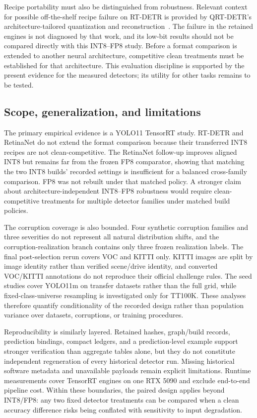 \documentclass[a4paper,fleqn]{cas-dc}
\begin{document}
Recipe portability must also be distinguished from robustness. Relevant context for possible off-the-shelf recipe failure on RT-DETR is provided by QRT-DETR's architecture-tailored quantization and reconstruction~\citep{huo2026qrt}. The failure in the retained engines is not diagnosed by that work, and its low-bit results should not be compared directly with this INT8--FP8 study. Before a format comparison is extended to another neural architecture, competitive clean treatments must be established for that architecture. This evaluation discipline is supported by the present evidence for the measured detectors; its utility for other tasks remains to be tested.

\subsection{Scope, generalization, and limitations}

The primary empirical evidence is a YOLO11 TensorRT study. RT-DETR and RetinaNet do not extend the format comparison because their transferred INT8 recipes are not clean-competitive. The RetinaNet follow-up improves aligned INT8 but remains far from the frozen FP8 comparator, showing that matching the two INT8 builds' recorded settings is insufficient for a balanced cross-family comparison. FP8 was not rebuilt under that matched policy. A stronger claim about architecture-independent INT8--FP8 robustness would require clean-competitive treatments for multiple detector families under matched build policies.

The corruption coverage is also bounded. Four synthetic corruption families and three severities do not represent all natural distribution shifts, and the corruption-realization branch contains only three frozen realization labels. The final post-selection rerun covers VOC and KITTI only. KITTI images are split by image identity rather than verified scene/drive identity, and converted VOC/KITTI annotations do not reproduce their official challenge rules. The seed studies cover YOLO11m on transfer datasets rather than the full grid, while fixed-class-universe resampling is investigated only for TT100K. These analyses therefore quantify conditionality of the recorded design rather than population variance over datasets, corruptions, or training procedures.

Reproducibility is similarly layered. Retained hashes, graph/build records, prediction bindings, compact ledgers, and a prediction-level example support stronger verification than aggregate tables alone, but they do not constitute independent regeneration of every historical detector run. Missing historical software metadata and unavailable payloads remain explicit limitations. Runtime measurements cover TensorRT engines on one RTX 5090 and exclude end-to-end pipeline cost. Within these boundaries, the paired design applies beyond INT8/FP8: any two fixed detector treatments can be compared when a clean accuracy difference risks being conflated with sensitivity to input degradation.
\end{document}

